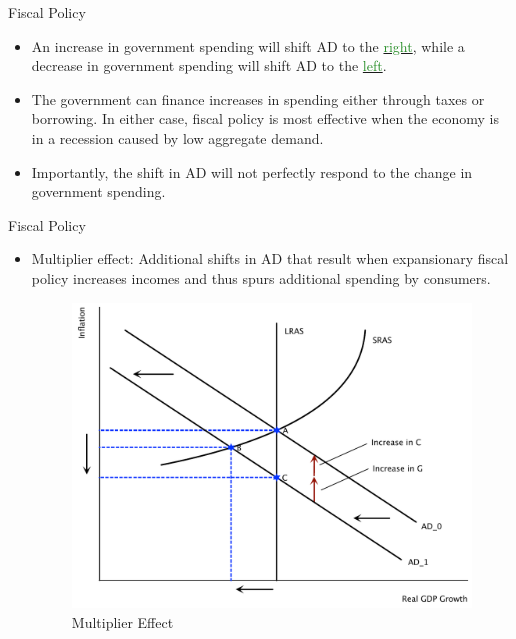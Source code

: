 \documentclass[xcolor={dvipsnames},pdf, hyperref={colorlinks=true, citecolor=ForestGreen, linkcolor=BlueViolet, urlcolor=Magenta}]{beamer}
\theoremstyle{definition}
\newcommand{\dd}[1]{{\underline{\textcolor{ForestGreen}{#1}}}}
\begin{document}
\begin{frame}{Fiscal Policy}
\begin{itemize}
	\item An increase in government spending will shift AD to the \dd{right}, while a decrease in government spending will shift AD to the \dd{left}. 
	\item The government can finance increases in spending either through taxes or borrowing. In either case, fiscal policy is most effective when the economy is in a recession caused by low aggregate demand. 
	
	\item Importantly, the shift in AD will not perfectly respond to the change in government spending. 
\end{itemize}
\end{frame}

\begin{frame}{Fiscal Policy}
	\begin{itemize}
		
			\item Multiplier effect: Additional shifts in AD that result when expansionary fiscal policy increases incomes and thus spurs additional spending by consumers.
			
			\begin{figure}[H]
				\centering
				\includegraphics[scale=.35]{plot104.pdf}
				\caption{Multiplier Effect}
			\end{figure}
	\end{itemize}
\end{frame}
\end{document}
